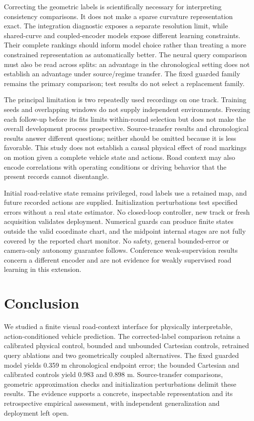 \documentclass[preprint,12pt]{elsarticle}
\begin{document}
Correcting the geometric labels is scientifically necessary for interpreting
consistency comparisons. It does not make a sparse curvature representation
exact. The integration diagnostic exposes a separate resolution limit, while
shared-curve and coupled-encoder models expose different learning constraints.
Their complete rankings should inform model choice rather than treating a more
constrained representation as automatically better. The neural query comparison must also be read across splits: an advantage in
the chronological setting does not establish an advantage under source/regime
transfer. The fixed guarded family remains the primary comparison; test results
do not select a replacement family.

The principal limitation is two repeatedly used recordings on one track.
Training seeds and overlapping windows do not supply independent environments.
Freezing each follow-up before its fits limits within-round selection but does
not make the overall development process prospective. Source-transfer results
and chronological results answer different questions; neither should be omitted
because it is less favorable. This study does not establish a causal physical
effect of road markings on motion given a complete vehicle state and actions.
Road context may also encode correlations with operating conditions or driving
behavior that the present records cannot disentangle.

Initial road-relative state remains privileged, road labels use a retained map,
and future recorded actions are supplied. Initialization perturbations test
specified errors without a real state estimator. No closed-loop controller,
new track or fresh acquisition validates deployment. Numerical guards can
produce finite states outside the valid coordinate chart, and the midpoint
internal stages are not fully covered by the reported chart monitor. No safety,
general bounded-error or camera-only autonomy guarantee follows. Conference
weak-supervision results concern a different encoder and are not evidence for
weakly supervised road learning in this extension.

\section{Conclusion}\label{sec:conclusion}
We studied a finite visual road-context interface for physically interpretable,
action-conditioned vehicle prediction. The corrected-label comparison retains
a calibrated physical control, bounded and unbounded Cartesian controls,
retrained query ablations and two geometrically coupled alternatives.
The fixed guarded model yields 0.359 m chronological endpoint error; the bounded Cartesian and calibrated controls yield 0.983 and 0.898 m. Source-transfer comparisons, geometric approximation checks and initialization
perturbations delimit these results. The evidence supports a concrete,
inspectable representation and its retrospective empirical assessment, with
independent generalization and deployment left open.
\end{document}
